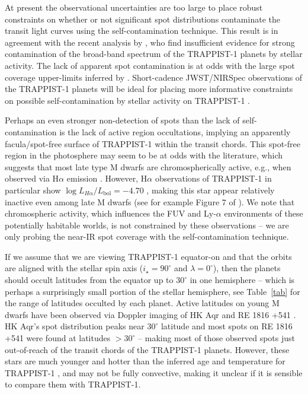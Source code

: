 At present the observational uncertainties are too large to place robust constraints on whether or not significant spot distributions contaminate the \spitzer transit light curves using the self-contamination technique. This result is in agreement with the recent analysis by \citet{Ducrot2018}, who find insufficient evidence for strong contamination of the broad-band spectrum of the TRAPPIST-1 planets by stellar activity. The lack of apparent spot contamination is at odds with the large spot coverage upper-limits inferred by \citet{Rackham2018,Zhang2018}. Short-cadence JWST/NIRSpec observations of the TRAPPIST-1 planets will be ideal for placing more informative constraints on possible self-contamination by stellar activity on TRAPPIST-1 \citep{Batalha2018}. 



Perhaps an even stronger non-detection of spots than the lack of self-contamination is the lack of active region occultations, implying an apparently facula/spot-free surface of TRAPPIST-1 within the transit chords. This spot-free region in the photosphere may seem to be at odds with the literature, which suggests that most late type M dwarfs are chromospherically active, e.g., when observed via H$\alpha$ emission \citep{West2008, West2015}. However, H$\alpha$ observations of TRAPPIST-1 in particular show $\log L_{H\alpha}/L_\mathrm{bol} = -4.70$ \citep{Reiners2018}, making this star appear relatively inactive even among late M dwarfs (see for example Figure 7 of \citealt{West2015}). We note that chromospheric activity, which influences the FUV and Ly-$\alpha$ environments of these potentially habitable worlds, is not constrained by these observations -- we are only probing the near-IR spot coverage with the self-contamination technique.


If we assume that we are viewing TRAPPIST-1 equator-on and that the orbits are aligned with the stellar spin axis ($i_\star=90^\circ$ and $\lambda = 0^\circ$), then the planets should occult latitudes from the equator up to $30^\circ$ in  one hemisphere -- which is perhaps a surprisingly small portion of the stellar hemisphere, see Table~\ref{tab} for the range of latitudes occulted by each planet. Active latitudes on young M dwarfs have been observed via Doppler imaging of HK Aqr and RE 1816 +541 \citep{Barnes2001}. HK Aqr's spot distribution peaks near $30^\circ$ latitude and most spots on RE 1816 +541 were found at latitudes $>30^\circ$ -- making most of those observed spots just out-of-reach of the transit chords of the TRAPPIST-1 planets. However, these stars are much younger and hotter than the inferred age and temperature for TRAPPIST-1 \citep{Burgasser2015}, and may not be fully convective, making it unclear if it is sensible to compare them with TRAPPIST-1.

